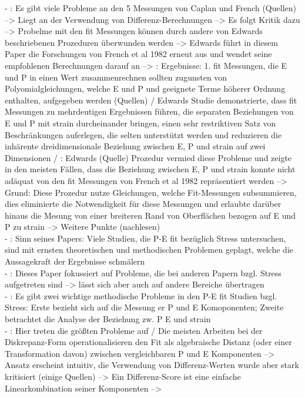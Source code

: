 - \cite[S. 2]{edwards:1993}: Es gibt viele Probleme an den 5 Messungen von Caplan und French (Quellen) --> Liegt an der Verwendung von Differenz-Berechnungen --> Es folgt Kritik dazu --> Probelme mit den fit Messungen können durch andere von Edwards beschriebenen Prozeduren überwunden werden --> Edwards führt in diesem Paper die Forschungen von French et al 1982 erneut aus und wendet seine empfohlenen Berechnungen darauf an --> \cite[S. 19]{edwards:1993}: Ergebnisse: 1. fit Messungen, die E und P in einen Wert zusammenrechnen sollten zugunsten von Polyomialgleichungen, welche E und P und geeignete Terme höherer Ordnung enthalten, aufgegeben werden (Quellen) / Edwards Studie demonstrierte, dass fit Messungen zu mehrdeutigen Ergebnissen führen, die separaten Beziehungen von E und P mit strain durcheinander bringen, einen sehr restriktiven Satz von Beschränkungen auferlegen, die selten unterstützt werden und reduzieren die inhärente dreidimensionale Beziehung zwischen E, P und strain auf zwei Dimensionen / \cite[S. 20]{edwards:1993}: Edwards (Quelle) Prozedur vermied diese Probleme und zeigte in den meisten Fällen, dass die Beziehung zwischen E, P und strain konnte nicht adäquat von den fit Messungen von French et al 1982 repräsentiert werden --> Grund: Diese Prozedur nutze Gleichungen, welche Fit-Messungen subsummieren, dies eliminierte die Notwendigkeit für diese Messungen und erlaubte darüber hinaus die Mesung von einer breiteren Rand von Oberflächen bezogen auf E und P zu strain --> Weitere Punkte (nachlesen) \\
- \cite[S. 2]{edwards:1990}: Sinn seines Papers: Viele Studien, die P-E fit bezüglich Stress untersuchen, sind mit ernsten theoretischen und methodischen Problemen geplagt, welche die Aussagekraft der Ergebnisse schmälern \\
- \cite[S. 3]{edwards:1990}: Dieses Paper fokussiert auf Probleme, die bei anderen Papern bzgl. Stress aufgetreten sind --> lässt sich aber auch auf andere Bereiche übertragen \\
- \cite[S. 7]{edwards:1990}: Es gibt zwei wichtige methodische Probleme in den P-E fit Studien bzgl. Stress: Erste bezieht sich auf die Messung er P und E Komoponenten; Zweite betrachtet die Analyse der Beziehung zw. P E und strain \\
- \cite[S. 9]{edwards:1990}: Hier treten die größten Probleme auf / Die meisten Arbeiten bei der Diskrepanz-Form operationalisieren den Fit als algebraische Distanz (oder einer Transformation davon) zwischen vergleichbaren P und E Komponenten --> Ansatz erscheint intuitiv, die Verwendung von Differenz-Werten wurde aber stark kritisiert (einige Quellen) --> Ein Differenz-Score ist eine einfache Linearkombination seiner Komponenten --> \\
